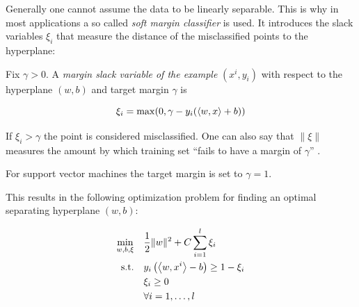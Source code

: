 Generally one cannot assume the data to be linearly separable. This is why in most applications a so called \emph{soft margin classifier} is used. It introduces the slack variables \(\xi_i\) that measure the distance of the misclassified points to the hyperplane:


Fix \(\gamma > 0\). A \emph{margin slack variable of the example} \((x^i,y_i)\) with respect to the hyperplane \((w,b)\) and target margin \(\gamma\) is 

\[\xi_i = \max(0, \gamma - y_i(\left\langle w,x\right\rangle+b))\] 

If \(\xi_i > \gamma\) the point is considered misclassified. 
One can also say that \(\|\xi\|\) measures the amount by which training set ``fails to have a margin of \(\gamma\)'' \cite[section 2.1.1]{Cristianini2000}.

For support vector machines the target margin is set to \(\gamma = 1\).


This results in the following optimization problem for finding an optimal separating hyperplane \((w,b)\): 

\begin{align}
\begin{split}
	\min_{w,b,\xi} \quad & \frac{1}{2} \|w\|^2+C\sum_{i=1}^l{\xi_i} \\
	\text{s.t.} \quad & y_i\left(\left\langle w,x^i\right\rangle-b\right) \geq 1 - \xi_i \\
	& \xi_i \geq 0 \\
	& 	\forall i = 1, \dots , l
\end{split}
\label{SVM_1}
\end{align}

%

